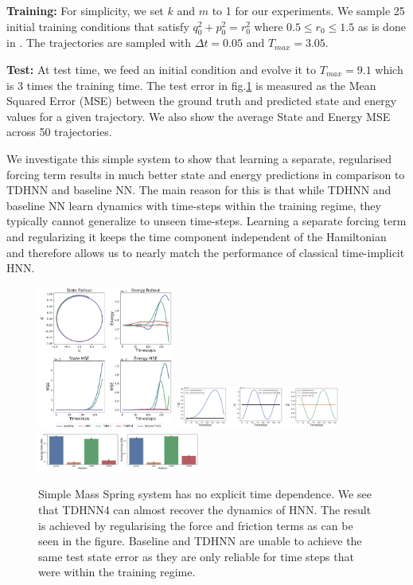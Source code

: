 \documentclass[twoside]{article}
\begin{document}
\textbf{Training:} For simplicity, we set $k$ and $m$ to 1 for our experiments. We sample 25 initial training conditions that satisfy $q_0^2+p_0^2 = r_0^2$ where $0.5 \leq r_0 \leq 1.5$ as is done in \cite{greydanus_hamiltonian_2019}. The trajectories are sampled with $\Delta t =0.05$ and $T_{max} = 3.05$.  

\textbf{Test:} At test time, we feed an initial condition and evolve it to $T_{max}=9.1$ which is 3 times the training time. The test error in fig.\ref{mspring} is measured as the Mean Squared Error (MSE) between the ground truth and predicted state and energy values for a given trajectory. We also show the average State and Energy MSE  across 50 trajectories. 

We investigate this simple system to show that learning a separate, regularised forcing term results in much better state and energy predictions in comparison to TDHNN and baseline NN. The main reason for this is that while TDHNN and baseline NN learn dynamics with time-steps within the training regime, they typically cannot generalize to unseen time-steps. Learning a separate forcing term and regularizing it keeps the time component independent of the Hamiltonian and therefore allows us to nearly match the performance of classical time-implicit HNN.

\begin{figure}[h!]
\centering
\includegraphics[width=0.4\textwidth]{figures/mass_spring_long_new.pdf}
\includegraphics[width=0.48\textwidth]{figures/dpdt_mass_spring.pdf}
\includegraphics[width=0.48\textwidth]{figures/mass_spring_errors.pdf}
\caption{Simple Mass Spring system has no explicit time dependence. We see that TDHNN4 can almost recover the dynamics of HNN. The result is achieved by regularising the force and friction terms as can be seen in the figure. Baseline and TDHNN are unable to achieve the same test state error as they are only reliable for time steps that were within the training regime.}
\label{mspring}
\end{figure}
\end{document}
